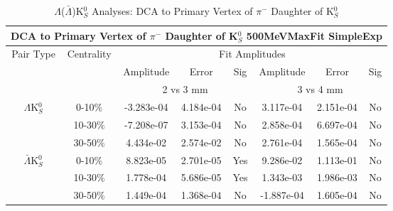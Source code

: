 \documentclass[../AnalysisNoteJBuxton.tex]{subfiles}
\begin{document}
\begin{table}
 \centering
 \begin{tabular}{|c|c|c|c|c||c|c|c|}
  \multicolumn{8}{c}{DCA to Primary Vertex of $\pi^{-}$ Daughter of K$^{0}_{S}$ 500MeVMaxFit SimpleExp} \\
  \hline
  \multirow{3}{*}{Pair Type} & \multirow{3}{*}{Centrality} & \multicolumn{6}{c|}{Fit Amplitudes} \\
  \cline{3-8}
   & & Amplitude & Error & Sig & Amplitude & Error & Sig \\  
  \cline{3-8}
   & & \multicolumn{3}{c||}{2 vs 3 mm} & \multicolumn{3}{c|}{3 vs 4 mm} \\  
  \hline  
  \multirow{3}{*}{$\Lambda$K$^{0}_{S}$}  
   &  0-10\% & -3.283e-04 & 4.184e-04 & No & 3.117e-04 & 2.151e-04 & No \\
   & 10-30\% & -7.208e-07 & 3.153e-04 & No & 2.858e-04 & 6.697e-04 & No \\
   & 30-50\% & 4.434e-02 & 2.574e-02 & No & 2.761e-04 & 1.565e-04 & No \\
  \hline  
  \multirow{3}{*}{$\bar{\Lambda}$K$^{0}_{S}$}  
   &  0-10\% & 8.823e-05 & 2.701e-05 & Yes & 9.286e-02 & 1.113e-01 & No \\
   & 10-30\% & 1.778e-04 & 5.686e-05 & Yes & 1.343e-03 & 1.986e-03 & No \\
   & 30-50\% & 1.449e-04 & 1.368e-04 & No & -1.887e-04 & 1.605e-04 & No \\
  \hline
 \end{tabular}
 \caption{$\Lambda$($\bar{\Lambda}$)K$^{0}_{S}$ Analyses: DCA to Primary Vertex of $\pi^{-}$ Daughter of K$^{0}_{S}$}
 \label{tab:DcaToPrimVertexNegPionDaughtOfK0LamK0_500MeVMaxFit_SimpleExp}
\end{table}






\end{document}
